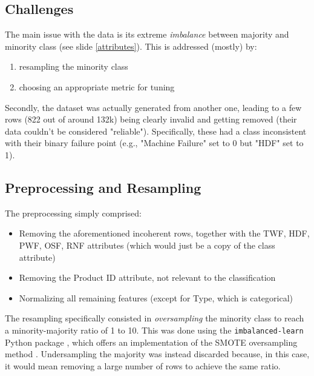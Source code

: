 \subsection{Challenges}
\begin{frame}{\subsecname}
The main issue with the data is its extreme \textit{imbalance} between majority and minority class (see slide \ref{attributes}). This is addressed (mostly) by:
\begin{enumerate}
    \justifying
    \small
    \item resampling the minority class 
    \item choosing an appropriate metric for tuning
\end{enumerate}

Secondly, the dataset was actually generated from another one, leading to a few rows (822 out of around 132k) being clearly invalid and getting removed (their data couldn't be considered "reliable"). Specifically, these had a class inconsistent with their binary failure point (e.g., "Machine Failure" set to 0 but "HDF" set to 1).
\end{frame}

\subsection{Preprocessing and Resampling}
\begin{frame}{\subsecname}
The preprocessing simply comprised:
\begin{itemize}
    \small
    \justifying
    \item Removing the aforementioned incoherent rows, together with the TWF, HDF, PWF, OSF, RNF attributes (which would just be a copy of the class attribute)
    \item Removing the Product ID attribute, not relevant to the classification
    \item Normalizing all remaining features (except for Type, which is categorical)
\end{itemize}

The resampling specifically consisted in \textit{oversampling} the minority class to reach a minority-majority ratio of 1 to 10. This was done using the \texttt{imbalanced-learn} Python package \cite{imblearn}, which offers an implementation of the SMOTE oversampling method \cite{DBLP:journals/corr/abs-1106-1813}. Undersampling the majority was instead discarded because, in this case, it would mean removing a large number of rows to achieve the same ratio.

\end{frame}